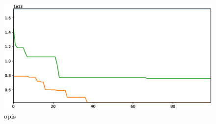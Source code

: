 \documentclass[11pt,a4paper]{article}
\begin{document}
\begin{figure}[H]
	\centering
	\includegraphics[scale=0.6]{cec2013_4.eps}
	\caption{opis}
\end{figure}
\end{document}
